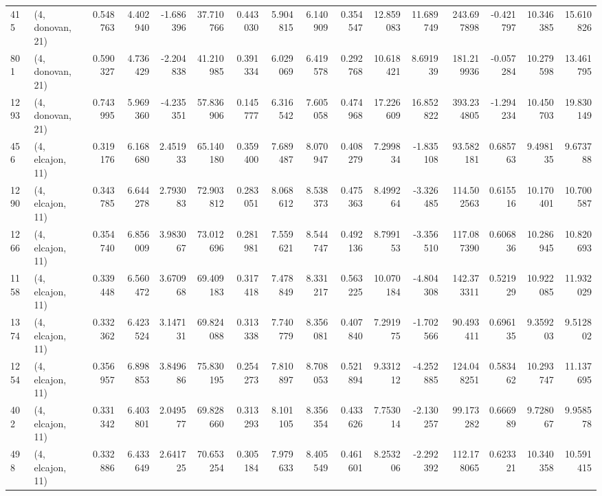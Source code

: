 \begin{tabular}{llrrrrrrrrrrrrrr}
415  &  (4, donovan, 21) &   0.548763 &   4.402940 &  -1.686396 &     37.710766 &    0.443030 &    5.904815 &    6.140909 &  0.354547 &  12.859083 &  11.689749 &   243.697898 &  -0.421797 &  10.346385 &  15.610826 \\
801  &  (4, donovan, 21) &   0.590327 &   4.736429 &  -2.204838 &     41.210985 &    0.391334 &    6.029069 &    6.419578 &  0.292768 &  10.618421 &   8.691939 &   181.219936 &  -0.057284 &  10.279598 &  13.461795 \\
1293 &  (4, donovan, 21) &   0.743995 &   5.969360 &  -4.235351 &     57.836906 &    0.145777 &    6.316542 &    7.605058 &  0.474968 &  17.226609 &  16.852822 &   393.234805 &  -1.294234 &  10.450703 &  19.830149 \\
456  &  (4, elcajon, 11) &   0.319176 &   6.168680 &   2.451933 &     65.140180 &    0.359400 &    7.689487 &    8.070947 &  0.408279 &   7.299834 &  -1.835108 &    93.582181 &   0.685763 &   9.498135 &   9.673788 \\
1290 &  (4, elcajon, 11) &   0.343785 &   6.644278 &   2.793083 &     72.903812 &    0.283051 &    8.068612 &    8.538373 &  0.475363 &   8.499264 &  -3.326485 &   114.502563 &   0.615516 &  10.170401 &  10.700587 \\
1266 &  (4, elcajon, 11) &   0.354740 &   6.856009 &   3.983067 &     73.012696 &    0.281981 &    7.559621 &    8.544747 &  0.492136 &   8.799153 &  -3.356510 &   117.087390 &   0.606836 &  10.286945 &  10.820693 \\
1158 &  (4, elcajon, 11) &   0.339448 &   6.560472 &   3.670968 &     69.409183 &    0.317418 &    7.478849 &    8.331217 &  0.563225 &  10.070184 &  -4.804308 &   142.373311 &   0.521929 &  10.922085 &  11.932029 \\
1374 &  (4, elcajon, 11) &   0.332362 &   6.423524 &   3.147131 &     69.824088 &    0.313338 &    7.740779 &    8.356081 &  0.407840 &   7.291975 &  -1.702566 &    90.493411 &   0.696135 &   9.359203 &   9.512802 \\
1254 &  (4, elcajon, 11) &   0.356957 &   6.898853 &   3.849686 &     75.830195 &    0.254273 &    7.810897 &    8.708053 &  0.521894 &   9.331212 &  -4.252885 &   124.048251 &   0.583462 &  10.293747 &  11.137695 \\
402  &  (4, elcajon, 11) &   0.331342 &   6.403801 &   2.049577 &     69.828660 &    0.313293 &    8.101105 &    8.356354 &  0.433626 &   7.753014 &  -2.130257 &    99.173282 &   0.666989 &   9.728067 &   9.958578 \\
498  &  (4, elcajon, 11) &   0.332886 &   6.433649 &   2.641725 &     70.653254 &    0.305184 &    7.979633 &    8.405549 &  0.461601 &   8.253206 &  -2.292392 &   112.178065 &   0.623321 &  10.340358 &  10.591415 \\

\end{tabular}
